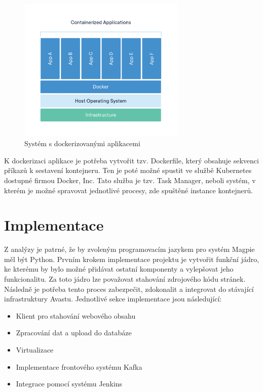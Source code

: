 \documentclass[thesis=M,czech,hidelinks]{FITthesis}[2013/05/06]
\begin{document}
\begin{figure}[h]
	\centering
	\includegraphics[width=8cm]{pictures/docker.png}
	\caption{Systém s dockerizovanými aplikacemi \cite{docker}}
	\label{fig:docker}
\end{figure}

K dockerizaci aplikace je potřeba vytvořit tzv. Dockerfile, který obsahuje sekvenci příkazů k sestavení kontejneru. Ten je poté možné spustit ve službě Kubernetes dostupné firmou Docker, Inc. Tato služba je tzv. Task Manager, neboli systém, v kterém je možné spravovat jednotlivé procesy, zde spuštěné instance kontejnerů.


\chapter{Implementace}
Z analýzy je patrné, že by zvoleným programovacím jazykem pro systém Magpie měl být Python. Prvním krokem implementace projektu je vytvořit funkční jádro, ke kterému by bylo možné přidávat ostatní komponenty a vylepšovat jeho funkcionalitu. Za toto jádro lze považovat stahování zdrojového kódu stránek. Následně je potřeba tento proces zabezpečit, zdokonalit a integrovat do stávající infrastruktury Avastu. Jednotlivé sekce implementace jsou následující:
\begin{itemize}
	\item Klient pro stahování webového obsahu
	\item Zpracování dat a upload do databáze
	\item Virtualizace 
	\item Implementace frontového systému Kafka
	\item Integrace pomocí systému Jenkins
\end{itemize} 
\end{document}
